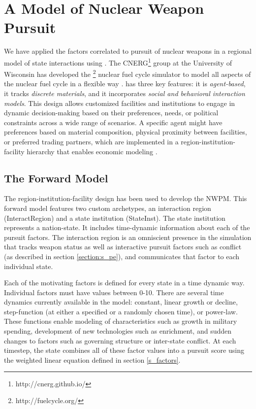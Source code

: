 \section{A \Cyclus Model of Nuclear Weapon Pursuit}
\label{s_methods}

We have applied the factors correlated to pursuit of nuclear weapons in a regional model of state interactions using \Cyclus\cite{huff_open_2011,huff_fundamental_2016,gidden_agent-based_2013}.  The \gls{CNERG}\footnote{http://cnerg.github.io/} group at the University of Wisconsin has developed the \Cyclus\footnote{http://fuelcycle.org/} nuclear fuel cycle simulator to model all aspects of the nuclear fuel cycle in a flexible way \cite{cyclus_v1_5}.  \Cyclus has three key features: it is \textit{agent-based}, it tracks \textit{discrete materials}, and it incorporates \textit{social and behavioral interaction models}\cite{jennings_agent-based_2000, taylor2014agent}. This design allows customized facilities and institutions to engage in dynamic decision-making based on their preferences, needs, or political constraints across a wide range of scenarios.  A specific agent might have preferences based on material composition, physical proximity between facilities, or preferred trading partners, which are implemented in a region-institution-facility hierarchy that enables economic modeling \cite{oliver_geniusv2:_2009}.

\subsection{The Forward Model}

The region-institution-facility design has been used to develop the \gls{NWPM}. This forward model features two custom archetypes, an interaction region (InteractRegion) and a state institution (StateInst)\cite{mbmore}.  The state institution represents a nation-state.  It includes time-dynamic information about each of the pursuit factors. The interaction region is an omniscient presence in the simulation that tracks weapon status as well as interactive pursuit factors such as conflict (as described in section \ref{section:s_pe}), and communicates that factor to each individual state. 

Each of the motivating factors is defined for every state in a time dynamic way. Individual factors must have values between 0-10. There are several time dynamics currently available in the model: constant, linear growth or decline, step-function (at either a specified or a randomly chosen time), or power-law.  These functions enable modeling of characteristics such as growth in military spending, development of new technologies such as enrichment, and sudden changes to factors such as governing structure or inter-state conflict.  At each timestep, the state combines all of these factor values into a pursuit score using the weighted linear equation defined in section \ref{s_factors}.

